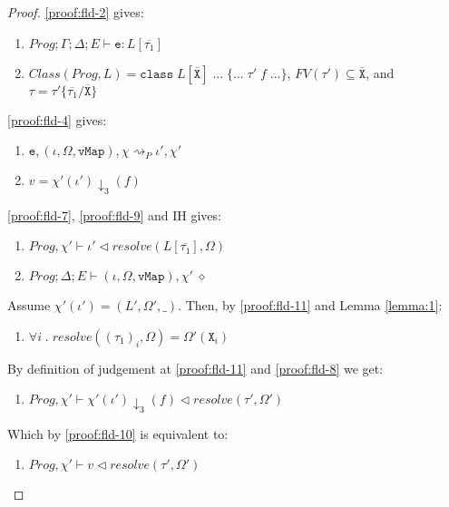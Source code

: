 \begin{proof} \ref{proof:fld-2} gives:
\begin{enumerate}[label=\arabic*), resume]
    \item \label{proof:fld-7} $Prog; \Gamma; \Delta; E \vdash \texttt{e} : L[\overline{\tau_1}]$ 
    \item \label{proof:fld-8} $Class(Prog, L) = \texttt{class} \; L[\overline{\texttt{X}}] \; ... \; \{... \; \tau' \; f \; ...\}$, $FV(\tau') \subseteq \overline{\texttt{X}}$, and $\tau = \tau'\{\overline{\tau_1}/\overline{\texttt{X}}\}$
\end{enumerate}
\ref{proof:fld-4} gives:
\begin{enumerate}[label=\arabic*), resume]
    \item \label{proof:fld-9} $\texttt{e}, (\iota, \Omega, \texttt{vMap}), \chi \rightsquigarrow_P \iota', \chi'$
    \item \label{proof:fld-10} $v = \chi'(\iota')\downarrow_3(f)$
\end{enumerate}
\ref{proof:fld-7}, \ref{proof:fld-9} and IH gives:
\begin{enumerate}[label=\arabic*), resume]
    \item \label{proof:fld-11} $Prog, \chi' \vdash \iota' \triangleleft resolve(L[\overline{\tau_1}], \Omega)$
    \item \label{proof:fld-12} $Prog; \Delta; E \vdash (\iota, \Omega, \texttt{vMap}), \chi' \; \diamond$
\end{enumerate}
Assume $\chi'(\iota') = (L', \Omega', \_)$. Then, by \ref{proof:fld-11} and Lemma \ref{lemma:1}:
\begin{enumerate}[label=\arabic*), resume]
    \item \label{proof:fld-13} $\forall i \; . \; resolve((\tau_1)_i, \Omega) = \Omega'(\texttt{X}_i)$
\end{enumerate}
By definition of judgement at \ref{proof:fld-11} and \ref{proof:fld-8} we get:
\begin{enumerate}[label=\arabic*), resume]
    \item \label{proof:fld-14} $Prog, \chi' \vdash \chi'(\iota')\downarrow_3(f) \triangleleft resolve(\tau', \Omega')$
\end{enumerate}
Which by \ref{proof:fld-10} is equivalent to:
\begin{enumerate}[label=\arabic*), resume]
    \item \label{proof:fld-15} $Prog, \chi' \vdash v \triangleleft resolve(\tau', \Omega')$
\end{enumerate}

\end{proof}
